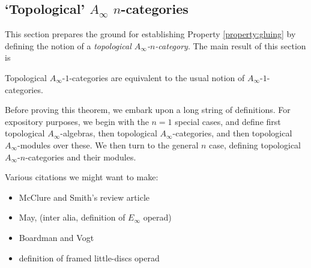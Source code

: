 \subsection{`Topological' $A_\infty$ $n$-categories}
\label{sec:topological-A-infty}%

This section prepares the ground for establishing Property \ref{property:gluing} by defining the notion of a \emph{topological $A_\infty$-$n$-category}.
The main result of this section is

\begin{thm}
Topological $A_\infty$-$1$-categories are equivalent to the usual notion of
$A_\infty$-$1$-categories.
\end{thm}

Before proving this theorem, we embark upon a long string of definitions.
For expository purposes, we begin with the $n=1$ special cases, and define
first topological $A_\infty$-algebras, then topological $A_\infty$-categories, and then topological $A_\infty$-modules over these. We then turn
to the general $n$ case, defining topological $A_\infty$-$n$-categories and their modules.

\todo{}
Various citations we might want to make:
\begin{itemize}
\item \cite{MR2061854} McClure and Smith's review article
\item \cite{MR0420610} May, (inter alia, definition of $E_\infty$ operad)
\item \cite{MR0236922,MR0420609} Boardman and Vogt
\item \cite{MR1256989} definition of framed little-discs operad
\end{itemize}

